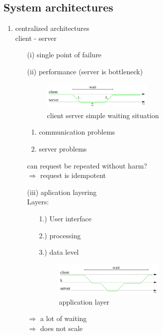 \documentclass[ngerman,a4paper]{report}
\begin{document}
\subsection{System architectures}
\begin{enumerate}
\item centralized architectures\\
client - server\\
\begin{itemize}
\item[(i)] single point of failure
\item[(ii)] performance (server is bottleneck)\\
\begin{figure}[h]
	\centering
	\includegraphics[width=200px]{gfx/cs_simple_wait.png}
	\caption{client server simple waiting situation}
	\label{img:cs_simple_wait}
\end{figure}
\begin{enumerate}
\item communication problems\\
\item server problems\\
\end{enumerate}
can request be repeated without harm?\\
$\Rightarrow$ request is idempotent
\item[(iii)] aplication layering\\
Layers:\begin{itemize}
\item[1.)] User interface
\item[2.)] processing
\item[3.)] data level
\begin{figure}[h]
	\centering
	\includegraphics[width=200px]{gfx/cs_app_layer.png}
	\caption{application layer}
	\label{img:cs_app_layer}
\end{figure}
\end{itemize}
$\Rightarrow$ a lot of waiting\\
$\Rightarrow$ does not scale\\
\end{itemize}

\end{enumerate}
\end{document}
